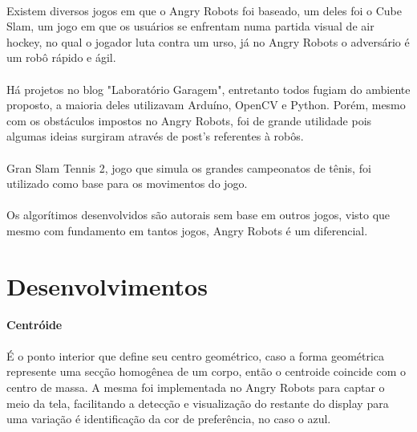 \documentclass{sciposter}
\begin{document}
\begin{multicols}{3}
\paragraph{}Existem diversos jogos em que o Angry Robots foi baseado, um deles foi o Cube Slam, um jogo em que os usuários se enfrentam numa partida visual de air hockey, no qual o jogador luta contra um urso, já no Angry Robots o adversário é um robô rápido e ágil.
\paragraph{}Há projetos no blog "Laboratório Garagem", entretanto todos fugiam do ambiente proposto, a maioria deles utilizavam Arduíno, OpenCV e Python. Porém, mesmo com os obstáculos impostos no Angry Robots, foi de grande utilidade pois algumas ideias surgiram através de post's referentes à robôs.
\paragraph{}Gran Slam Tennis 2, jogo que simula os grandes campeonatos de tênis, foi utilizado como base para os movimentos do jogo. 
\paragraph{}Os algorítimos desenvolvidos são autorais sem base em outros jogos, visto que mesmo com fundamento em tantos jogos, Angry Robots é um diferencial.

\section{Desenvolvimentos}

\textbf{Centróide} \\ \\ 
É o ponto interior que define seu centro geométrico, caso a forma geométrica represente uma secção homogênea de um corpo, então o centroide coincide com o centro de massa. A mesma foi implementada no Angry Robots para captar o meio da tela, facilitando a detecção e visualização do restante do display para uma variação é identificação da cor de preferência, no caso o azul.


\end{multicols}
\end{document}
